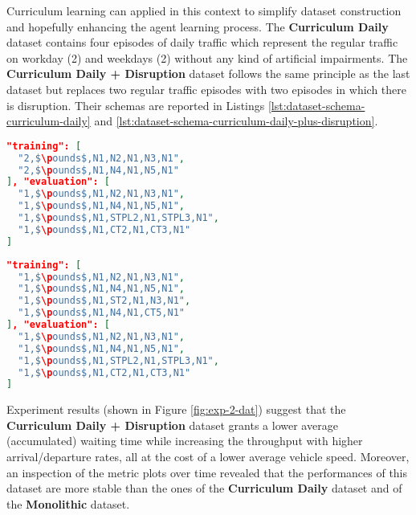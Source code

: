 Curriculum learning can applied in this context to simplify dataset construction and hopefully enhancing the agent learning process.
The \textbf{Curriculum Daily} dataset contains four episodes of daily traffic which represent the regular traffic on workday (2) and weekdays (2) without any kind of artificial impairments.
The \textbf{Curriculum Daily + Disruption} dataset follows the same principle as the last dataset but replaces two regular traffic episodes with two episodes in which there is disruption.
Their schemas are reported in Listings \ref{lst:dataset-schema-curriculum-daily} and \ref{lst:dataset-schema-curriculum-daily-plus-disruption}.

\noindent
\begin{minipage}{\linewidth}
\begin{lstlisting}[language=JSON, caption=The schema for the "Curriculum Daily" Dataset, label={lst:dataset-schema-curriculum-daily}, mathescape=true]
"training": [
  "2,$\pounds$,N1,N2,N1,N3,N1",
  "2,$\pounds$,N1,N4,N1,N5,N1"
], "evaluation": [
  "1,$\pounds$,N1,N2,N1,N3,N1",
  "1,$\pounds$,N1,N4,N1,N5,N1",
  "1,$\pounds$,N1,STPL2,N1,STPL3,N1",
  "1,$\pounds$,N1,CT2,N1,CT3,N1"
]
\end{lstlisting}
\end{minipage}

\noindent
\begin{minipage}{\linewidth}
\begin{lstlisting}[language=JSON, caption=The schema for the "Curriculum Daily + Disruption" Dataset, label={lst:dataset-schema-curriculum-daily-plus-disruption}, mathescape=true]
"training": [
  "1,$\pounds$,N1,N2,N1,N3,N1",
  "1,$\pounds$,N1,N4,N1,N5,N1",
  "1,$\pounds$,N1,ST2,N1,N3,N1",
  "1,$\pounds$,N1,N4,N1,CT5,N1"
], "evaluation": [
  "1,$\pounds$,N1,N2,N1,N3,N1",
  "1,$\pounds$,N1,N4,N1,N5,N1",
  "1,$\pounds$,N1,STPL2,N1,STPL3,N1",
  "1,$\pounds$,N1,CT2,N1,CT3,N1"
]
\end{lstlisting}
\end{minipage}

Experiment results (shown in Figure \ref{fig:exp-2-dat}) suggest that the \textbf{Curriculum Daily + Disruption} dataset grants a lower average (accumulated) waiting time while increasing the throughput with higher arrival/departure rates, all at the cost of a lower average vehicle speed. Moreover, an inspection of the metric plots over time revealed that the performances of this dataset are more stable than the ones of the \textbf{Curriculum Daily} dataset and of the \textbf{Monolithic} dataset.

